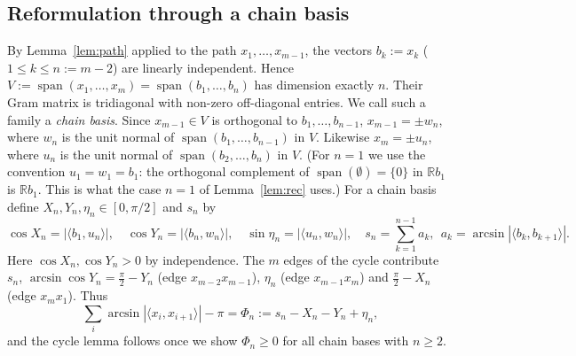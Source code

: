\documentclass[11pt]{article}
\theoremstyle{remark}
\begin{document}
\subsection{Reformulation through a chain basis}
By Lemma~\ref{lem:path} applied to the path $x_1,\dots,x_{m-1}$,
the vectors $b_k:=x_k$ ($1\le k\le n:=m-2$) are linearly independent.
Hence $V:=\operatorname{span}(x_1,\dots,x_m)=\operatorname{span}(b_1,\dots,b_n)$
has dimension exactly $n$. Their Gram matrix is tridiagonal with
non-zero off-diagonal entries. We call such a family a \emph{chain
basis}. Since $x_{m-1}\in V$ is orthogonal to $b_1,\dots,b_{n-1}$,
$x_{m-1}=\pm w_n$, where $w_n$ is the unit normal of
$\operatorname{span}(b_1,\dots,b_{n-1})$ in $V$. Likewise
$x_m=\pm u_n$, where $u_n$ is the unit normal of
$\operatorname{span}(b_2,\dots,b_n)$ in $V$. (For $n=1$ we use the convention $u_1=w_1=b_1$: the orthogonal complement of $\operatorname{span}(\emptyset)=\{0\}$ in $\mathbb R b_1$ is $\mathbb R b_1$. This is what the case $n=1$ of Lemma~\ref{lem:rec} uses.) For a chain basis define
$X_n,Y_n,\eta_n\in[0,\pi/2]$ and $s_n$ by
\[
\cos X_n=|\langle b_1,u_n\rangle|,\quad
\cos Y_n=|\langle b_n,w_n\rangle|,\quad
\sin\eta_n=|\langle u_n,w_n\rangle|,\quad
s_n=\sum_{k=1}^{n-1}a_k,\ \ a_k=\arcsin|\langle b_k,b_{k+1}\rangle|.
\]
Here $\cos X_n,\cos Y_n>0$ by independence. The $m$ edges of the cycle
contribute $s_n$, $\arcsin\cos Y_n=\frac\pi2-Y_n$ (edge $x_{m-2}x_{m-1}$),
$\eta_n$ (edge $x_{m-1}x_m$) and $\frac\pi2-X_n$ (edge $x_mx_1$). Thus
\begin{equation}\label{eq:phi}
\sum_{i}\arcsin|\langle x_i,x_{i+1}\rangle|-\pi=\Phi_n:=s_n-X_n-Y_n+\eta_n,
\end{equation}
and the cycle lemma follows once we show $\Phi_n\ge0$ for all chain bases with $n\ge2$.
\end{document}
